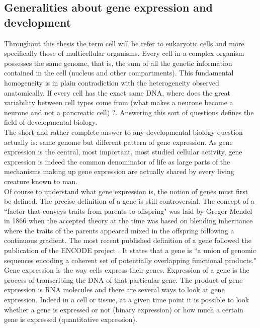      \subsection{Generalities about gene expression and development}  
     Throughout this thesis the term cell will be refer to eukaryotic cells and more specifically those of multicellular organisms. Every cell in a complex organism possesses the same genome, that is, the sum of all the genetic information contained in the cell (nucleus and other compartments). This fundamental homogeneity is in plain contradiction with the heterogeneity observed anatomically. If every cell has the exact same DNA, where does the great variability between cell types come from (what makes a neurone become a neurone and not a pancreatic cell) ?. Answering this sort of questions defines the field of developmental biology.\\
     
     The short and rather complete answer to any developmental biology question actually is: same genome but different pattern of gene expression. As gene expression is the central, most important, most studied cellular activity, gene expression is indeed the common denominator of life as large parts of the mechanisms making up gene expression are actually shared by every living creature known to man.\\

     Of course to understand what gene expression is, the notion of genes must first be defined. The precise definition of a gene is still controversial. The concept of a ``factor that conveys traits from parents to offspring" was laid by Gregor Mendel in 1866 \cite{mendel66} when the accepted theory at the time was based on blending inheritance where the traits of the parents appeared mixed in the offspring following a continuous gradient. The most recent published definition of a gene followed the publication of the ENCODE project \cite{feingold04}. It states that a gene is ``a union of genomic sequences encoding a coherent set of potentially overlapping functional products."\\

	Gene expression is the way cells express their genes. Expression of a gene is the process of transcribing the DNA of that particular gene. The product of gene expression is RNA molecules and there are several ways to look at gene expression. Indeed in a cell or tissue, at a given time point it is possible to look whether a gene is expressed or not (binary expression) or how much a certain gene is expressed (quantitative expression).\\
	
